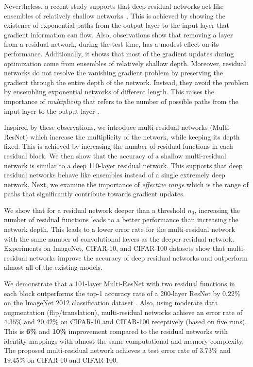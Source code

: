 \documentclass[journal]{IEEEtran}
\begin{document}
Nevertheless, a recent study  supports that deep residual networks  act like ensembles of relatively shallow networks~\cite{veit2016residual}. This is achieved by showing the existence of exponential paths from the output layer to the input layer that gradient information can flow. Also, observations show that removing a layer from a residual network, during the test time, has a modest effect on its performance. Additionally, it shows that most of the gradient updates during optimization come from ensembles of relatively shallow depth. Moreover, residual networks do not resolve the vanishing gradient problem by preserving the gradient through the entire depth of the network. Instead, they avoid the problem by ensembling  exponential networks of different length. This raises the importance of \textit{multiplicity} that refers to the number of possible paths from the input layer to the output layer \cite{veit2016residual}.


Inspired by these observations, we introduce multi-residual networks (Multi-ResNet) which increase the multiplicity of the network, while keeping its depth fixed. This is achieved by increasing the  number of residual functions in each residual block. We then show that the accuracy of a shallow multi-residual network is similar to a deep 110-layer residual network. This supports that deep residual networks behave like ensembles instead of a single extremely deep network. Next, we examine the importance of \textit{effective range} which is the range of paths that significantly contribute towards gradient updates. 

We show that for a residual network deeper than a threshold $n_0$, increasing the number of residual functions leads to a better performance than increasing the network depth. This leads to a lower error rate for the multi-residual network with the same number of convolutional layers as the deeper residual network. Experiments on ImageNet, CIFAR-10, and CIFAR-100 datasets show that multi-residual networks improve the accuracy of deep residual networks and outperform almost all of the existing models. 

We demonstrate that a 101-layer Multi-ResNet with two residual functions in each block outperforms the top-1 accuracy rate of a 200-layer ResNet by $0.22\%$ on the ImageNet 2012 classification dataset \cite{ILSVRC15}. Also, using moderate data augmentation (flip/translation), multi-residual networks achieve an error rate of $4.35\%$ and $20.42\%$ on CIFAR-10 and CIFAR-100 receptively (based on five runs). This is \textbf{6\%} and \textbf{10\%} improvement compared to the residual networks with identity mappings \cite{he2016identity} with almost the same computational and memory complexity. The proposed multi-residual network achieves a test error rate of $3.73\%$ and $19.45\%$ on CIFAR-10 and CIFAR-100. 
\end{document}
